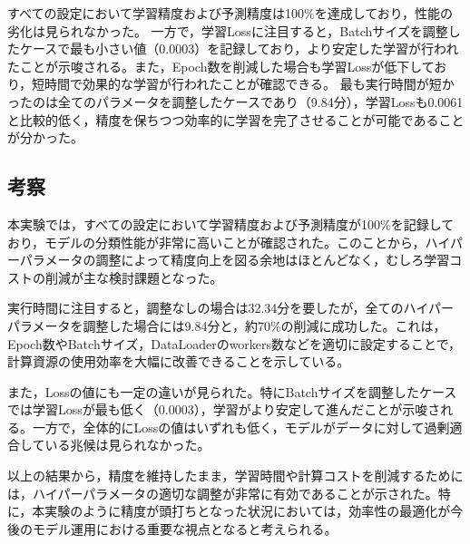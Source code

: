 \documentclass[a4paper,11pt,titlepage]{jsarticle}
\begin{document}
すべての設定において学習精度および予測精度は100\%を達成しており，性能の劣化は見られなかった。
一方で，学習Lossに注目すると，Batchサイズを調整したケースで最も小さい値（0.0003）を記録しており，より安定した学習が行われたことが示唆される。また，Epoch数を削減した場合も学習Lossが低下しており，短時間で効果的な学習が行われたことが確認できる。
最も実行時間が短かったのは全てのパラメータを調整したケースであり（9.84分），学習Lossも0.0061と比較的低く，精度を保ちつつ効率的に学習を完了させることが可能であることが分かった。

\subsection{考察}
本実験では，すべての設定において学習精度および予測精度が100\%を記録しており，モデルの分類性能が非常に高いことが確認された。このことから，ハイパーパラメータの調整によって精度向上を図る余地はほとんどなく，むしろ学習コストの削減が主な検討課題となった。

実行時間に注目すると，調整なしの場合は32.34分を要したが，全てのハイパーパラメータを調整した場合には9.84分と，約70\%の削減に成功した。これは，Epoch数やBatchサイズ，DataLoaderのworkers数などを適切に設定することで，計算資源の使用効率を大幅に改善できることを示している。

また，Lossの値にも一定の違いが見られた。特にBatchサイズを調整したケースでは学習Lossが最も低く（0.0003），学習がより安定して進んだことが示唆される。一方で，全体的にLossの値はいずれも低く，モデルがデータに対して過剰適合している兆候は見られなかった。

以上の結果から，精度を維持したまま，学習時間や計算コストを削減するためには，ハイパーパラメータの適切な調整が非常に有効であることが示された。特に，本実験のように精度が頭打ちとなった状況においては，効率性の最適化が今後のモデル運用における重要な視点となると考えられる。
\end{document}
